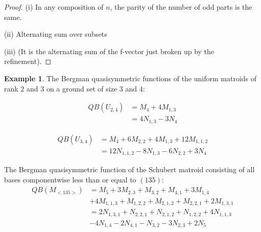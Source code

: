 \documentclass[12pt,reqno]{amsart}
\numberwithin{definition}{section}
\theoremstyle{definition}
\newtheorem{example}[definition]{Example}
\begin{document}
\begin{proof}

(i) In any composition of $n$, the parity of the number of odd parts is the same.

(ii) Alternating sum over subsets

(iii) (It is the alternating sum of the f-vector just broken up by the refinement).

\end{proof}

\begin{example}


The Bergman quasisymmetric functions of the uniform matroids of rank $2$ and $3$ on a ground set of size $3$ and $4$:

\begin{align*}
QB(U_{2,4}) & = M_4 + 4M_{1,3}\\
& = 4N_{1,3} - 3N_4
\end{align*}

\begin{align*}
QB(U_{3,4}) & =  M_4 + 6M_{2,2} + 4M_{1,3} + 12M_{1,1,2}\\
            & =  12 N_{1,1,2} - 8 N_{1,3} - 6N_{2,2} + 3N_4
\end{align*}

The Bergman quasisymmetric function of the Schubert matroid consisting of all bases componentwise less than or equal to $(135)$:
\begin{align*}
QB(M_{<135>}) & =  M_5 + 3M_{2,3} + M_{3,2} + M_{4,1} + 3M_{1,4} \\ & + 4M_{1,1,3} + M_{1,2,2} + M_{2,1,2} + M_{2,2,1} + 2M_{1,3,1}\\
&  =  2N_{1,3,1} + N_{2,2,1} + N_{2,1,2} + N_{1,2,2} + 4N_{1,1,3} \\ & - 4 N_{1,4} - 2N_{4,1} - N_{3,2} - 3N_{2,3} + 2N_5
\end{align*}

\end{example}




\end{document}
